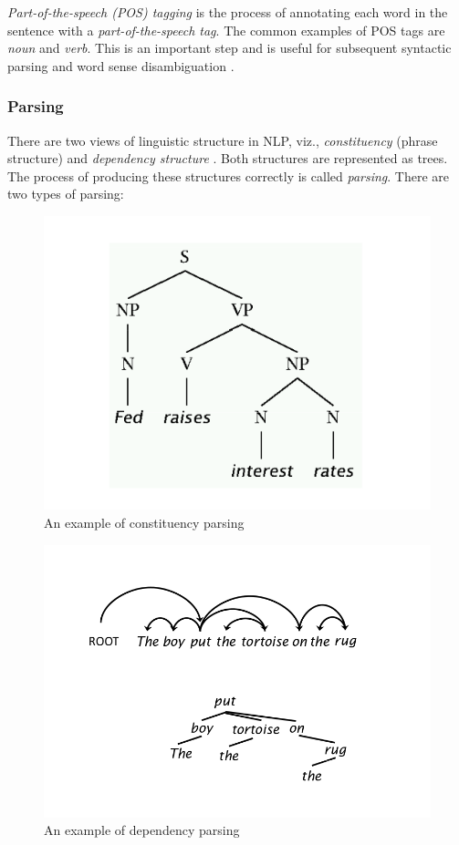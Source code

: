 \textit{Part-of-the-speech (POS) tagging} is the process of annotating each word in the sentence with a \textit{part-of-the-speech tag}. The common examples of POS tags are \textit{noun} and \textit{verb}. This is an important step and is useful for subsequent syntactic parsing and word sense disambiguation \cite{nlpcourse}. 

\subsubsection{Parsing}

There are two views of linguistic structure in NLP, viz., \textit{constituency} (phrase structure) and \textit{dependency structure} \cite{parsing}. Both structures are represented as trees. The process of producing these structures correctly is called \textit{parsing}. There are two types of parsing:

\begin{figure}
\centering
\includegraphics[scale=0.5]{figures/SyntacticParse.png}
\caption{An example of constituency parsing}\label{fig:SynParse}
\end{figure}

\begin{figure}
\centering
\includegraphics[scale=0.4]{figures/DependencyParse.png}
\caption{An example of dependency parsing}\label{fig:DepParse}
\end{figure}


